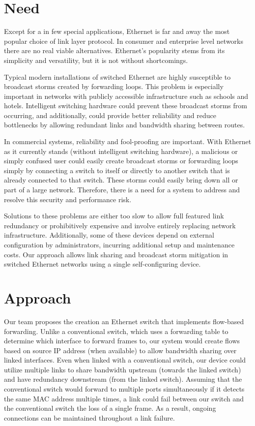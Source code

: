 \documentclass{article}
\begin{document}
\begin{multicols}{2}
\section{Need}
	Except for a in few special applications, Ethernet is far and away the most popular choice of link layer protocol.
	In consumer and enterprise level networks there are no real viable alternatives.
	Ethernet's popularity stems from its simplicity and versatility, but it is not without shortcomings.

	Typical modern installations of switched Ethernet are highly susceptible to broadcast storms created by forwarding loops.
	This problem is especially important in networks with publicly accessible infrastructure such as schools and hotels.
	Intelligent switching hardware could prevent these broadcast storms from occurring, and additionally, could provide better reliability and reduce bottlenecks by allowing redundant links and bandwidth sharing between routes.
	
	In commercial systems, reliability and fool-proofing are important.
	With Ethernet as it currently stands (without intelligent switching hardware), a malicious or simply confused user could easily create broadcast storms or forwarding loops simply by connecting a switch to itself or directly to another switch that is already connected to that switch.
	These storms could easily bring down all or part of a large network.
	Therefore, there is a need for a system to address and resolve this security and performance risk.
	
	Solutions to these problems are either too slow to allow full featured link redundancy or prohibitively expensive and involve entirely replacing network infrastructure.
	Additionally, some of these devices depend on external configuration by administrators, incurring additional setup  and maintenance costs.
	Our approach allows link sharing and broadcast storm mitigation in switched Ethernet networks using a single self-configuring device.
\section{Approach}
	Our team proposes the creation an Ethernet switch that implements flow-based forwarding.
	Unlike a conventional switch, which uses a forwarding table to determine which interface to forward frames to, our system would create flows based on source IP address (when available) to allow bandwidth sharing over linked interfaces.
	Even when linked with a conventional switch, our device could utilize multiple links to share bandwidth upstream (towards the linked switch) and have redundancy downstream (from the linked switch).
	Assuming that the conventional switch would forward to multiple ports simultaneously if it detects the same MAC address multiple times, a link could fail between our switch and the conventional switch the loss of a single frame.
	As a result, ongoing connections can be maintained throughout a link failure.


\end{multicols}
\end{document}
